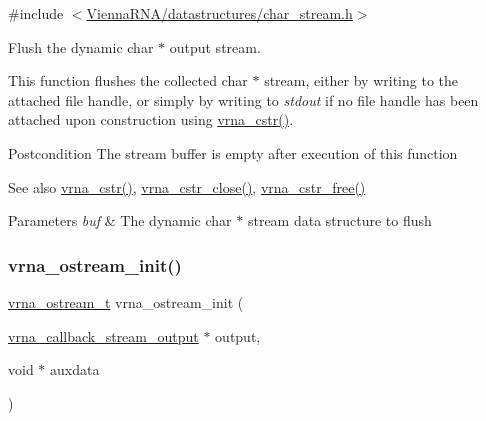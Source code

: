 {\ttfamily \#include $<$\mbox{\hyperlink{datastructures_2char__stream_8h}{Vienna\+R\+N\+A/datastructures/char\+\_\+stream.\+h}}$>$}



Flush the dynamic char $\ast$ output stream. 

This function flushes the collected char $\ast$ stream, either by writing to the attached file handle, or simply by writing to {\itshape stdout} if no file handle has been attached upon construction using \mbox{\hyperlink{group__buffer__utils_gadb2818f368e10a3b60a96bb3c80228d2}{vrna\+\_\+cstr()}}.

\begin{DoxyPostcond}{Postcondition}
The stream buffer is empty after execution of this function
\end{DoxyPostcond}
\begin{DoxySeeAlso}{See also}
\mbox{\hyperlink{group__buffer__utils_gadb2818f368e10a3b60a96bb3c80228d2}{vrna\+\_\+cstr()}}, \mbox{\hyperlink{group__buffer__utils_ga5a3f6a0a73b3d2d38fe011cdaed0ad28}{vrna\+\_\+cstr\+\_\+close()}}, \mbox{\hyperlink{group__buffer__utils_ga7ec48ec280f699928c70428cc245dc77}{vrna\+\_\+cstr\+\_\+free()}}
\end{DoxySeeAlso}

\begin{DoxyParams}{Parameters}
{\em buf} & The dynamic char $\ast$ stream data structure to flush \\
\hline
\end{DoxyParams}
\mbox{\label{group__buffer__utils_gad23113e66a0910ec2341856e2da56bf6}} 
\subsubsection{\texorpdfstring{vrna\_ostream\_init()}{vrna\_ostream\_init()}}
{\footnotesize\ttfamily \mbox{\hyperlink{group__buffer__utils_ga8da189552af21ab6e4e88bdcc240870c}{vrna\+\_\+ostream\+\_\+t}} vrna\+\_\+ostream\+\_\+init (\begin{DoxyParamCaption}\item[{\mbox{\hyperlink{group__buffer__utils_ga4adb94338a6f0a1a451e03c1bdac0d9d}{vrna\+\_\+callback\+\_\+stream\+\_\+output}} $\ast$}]{output,  }\item[{void $\ast$}]{auxdata }\end{DoxyParamCaption})}



